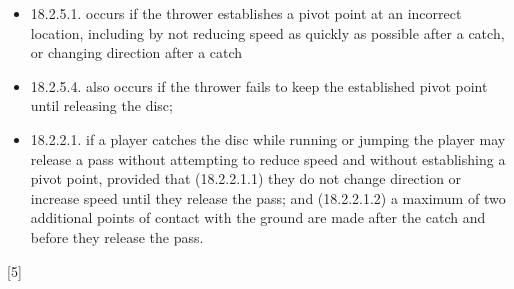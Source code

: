 \begin{itemize}[noitemsep]
\begin{itemize}
            \item 18.2.5.1. occurs if the thrower establishes a pivot point at an incorrect location, including by not reducing speed as quickly as possible after a catch, or changing direction after a catch
            \item 18.2.5.4. also occurs if the thrower fails to keep the established pivot point until releasing the disc;
            \item 18.2.2.1. if a player catches the disc while running or jumping the player may release a pass without attempting to reduce speed and without establishing a pivot point, provided that (18.2.2.1.1) they do not change direction or increase speed until they release the pass; and (18.2.2.1.2) a maximum of two additional points of contact with the ground are made after the catch and before they release the pass.
        \end{itemize}
\end{itemize}
\begin{center}[5]\end{center}
